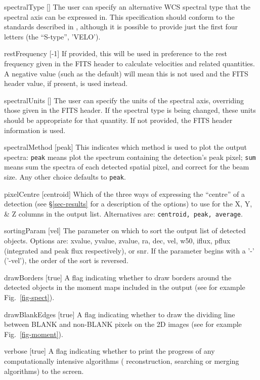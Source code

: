 \begin{Lentry}
\item[{spectralType []}] The user can specify an alternative WCS
  spectral type that the spectral axis can be expressed in. This
  specification should conform to the standards described in
  \citet{greisen06}, although it is possible to provide just the first
  four letters (the ``S-type'', \eg 'VELO').
\item[{restFrequency [-1]}] If provided, this will be used in
  preference to the rest frequency given in the FITS header to
  calculate velocities and related quantities. A negative value (such
  as the default) will mean this is not used and the FITS header
  value, if present, is used instead.
\item[{spectralUnits []}] The user can specify the units of
  the spectral axis, overriding those given in the FITS header. If the
  spectral type is being changed, these units should be appropriate
  for that quantity. If not provided, the FITS header information is
  used. 
\end{Lentry}

\begin{Lentry}
\item[{spectralMethod [peak]}] This indicates which method is used
  to plot the output spectra: \texttt{peak} means plot the spectrum
  containing the detection's peak pixel; \texttt{sum} means sum the
  spectra of each detected spatial pixel, and correct for the beam
  size. Any other choice defaults to \texttt{peak}.
\item[{pixelCentre [centroid]}] Which of the three ways of
  expressing the ``centre'' of a detection (see \S\ref{sec-results}
  for a description of the options) to use for the X, Y, \& Z
  columns in the output list. Alternatives are: \texttt{centroid, peak,
  average}.
\item[{sortingParam [vel]}] The parameter on which to sort the output
  list of detected objects. Options are: xvalue, yvalue, zvalue, ra,
  dec, vel, w50, iflux, pflux (integrated and peak flux respectively),
  or snr. If the parameter begins with a '-' (\eg '-vel'), the order
  of the sort is reversed.
\item[{drawBorders [true]}] A flag indicating whether to draw
  borders around the detected objects in the moment maps included in
  the output (see for example Fig.~\ref{fig-spect}).
\item[{drawBlankEdges [true]}] A flag indicating whether to
  draw the dividing line between BLANK and non-BLANK pixels on the
  2D images (see for example Fig.~\ref{fig-moment}).
\item[{verbose [true]}] A flag indicating whether to print the
  progress of any computationally intensive algorithms (\eg
  reconstruction, searching or merging algorithms) to the screen.
\end{Lentry}


